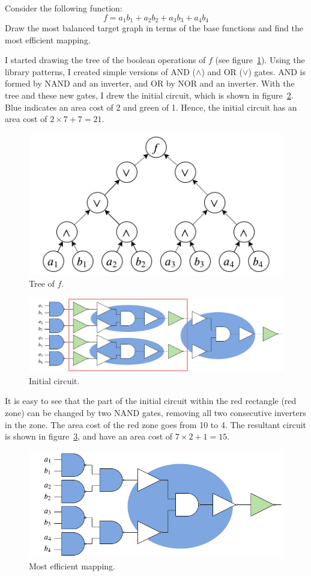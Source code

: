 \documentclass[a4paper, 10pt]{article}
\begin{document}
{\color{statement} Consider the following function:
\[f = a_1b_1+a_2b_2+a_3b_3+a_4b_4\]
Draw the most balanced target graph in terms of the base functions and find the most efficient mapping.}

I started drawing the tree of the boolean operations of $f$ (see figure~\ref{fig:tree_f}). Using the library patterns, I created simple versions of AND ($\land$) and OR ($\lor$) gates. AND is formed by NAND and an inverter, and OR by NOR and an inverter. With the tree and these new gates, I drew the initial circuit, which is shown in figure~\ref{fig:init_circuit}. Blue indicates an area cost of 2 and green of 1. Hence, the initial circuit has an area cost of $2\times7 + 7 = 21$. 
\begin{figure}[htbp]
    \centering
    \includegraphics[width=0.5\linewidth]{3_2_1.png}
    \caption{Tree of $f$.}
    \label{fig:tree_f}
\end{figure}


\begin{figure}[htbp]
    \centering
    \includegraphics[width=\linewidth]{3_2_2.png}
    \caption{Initial circuit.}
    \label{fig:init_circuit}
\end{figure}

It is easy to see that the part of the initial circuit within the red rectangle (red zone) can be changed by two NAND gates, removing all two consecutive inverters in the zone. The area cost of the red zone goes from 10 to 4. The resultant circuit is shown in figure~\ref{fig:best_mapping}, and have an area cost of $7\times2 + 1 = 15$.

\begin{figure}[htbp]
    \centering
    \includegraphics[width=0.7\linewidth]{3_2_3.png}
    \caption{Most efficient mapping.}
    \label{fig:best_mapping}
\end{figure}
\end{document}
